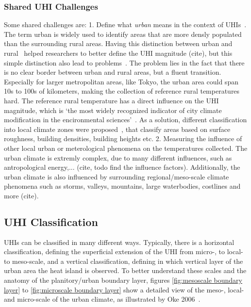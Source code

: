 \subsubsection{Shared UHI Challenges}

Some shared challenges are: 1. Define what \textit{urban} means in the context of UHIs~\cite{stewart2009newly}. The term urban is widely used to identify areas that are more densly populated than the surrounding rural areas. Having this distinction between urban and rural~\cite{lowry1977empirical} helped researchers to better define the UHI magnitude (cite), but this simple distinction also lead to problems~\cite{stewart2011systematic}. The problem lies in the fact that there is no clear border between urban and rural areas, but a fluent transition. Especially for larger metropolitan areas, like Tokyo, the urban area could span 10s to 100s of kilometers, making the collection of reference rural temperatures hard. The reference rural temperature has a direct influence on the UHI magnitude, which is `the most widely recognized indicator of city climate modification in the encironmental sciences'~\cite{stewart2009newly}. As a solution, different classification into local climate zones were proposed~\cite{stewart2012local, stewart2009newly}, that classify areas based on surface roughness, building densities, building heights etc. 2. Measuring the influence of other local urban or meterological phenomena on the temperatures collected. The urban climate is extremly complex, due to many different influences, such as antropological energy,... (cite, todo find the influence factors). Additionally, the urban climate is also influenced by surrounding regional/meso-scale climate phenomena such as storms, valleys, mountains, large waterbodies, costlines and more (cite).

\subsection{UHI Classification}

UHIs can be classified in many different ways. Typically, there is a horizontal classification, defining the superficial extension of the UHI from micro-, to local- to meso-scale, and a vertical classification, defining in which vertical layer of the urban area the heat island is observed. To better understand these scales and the anatomy of the planitory/urban boundary layer, figures \ref{fig:mesoscale boundary layer} to \ref{fig:microscale boundary layer} show a detailed view of the meso-, local- and micro-scale of the urban climate, as illustrated by Oke 2006~\cite{oke2006guideline}.

